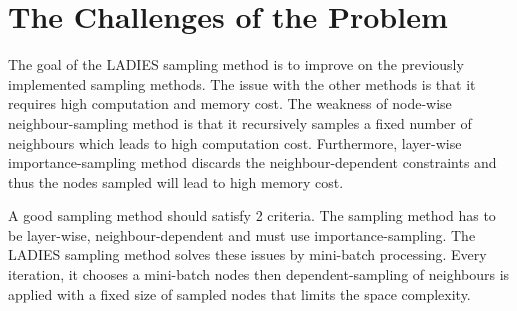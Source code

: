 \chapter{The Challenges of the Problem}

The goal of the LADIES sampling method is to improve on the previously implemented sampling methods. The issue with the other methods is that it requires high computation and memory cost. The weakness of node-wise neighbour-sampling method is that it recursively samples a fixed number of neighbours which leads to high computation cost. Furthermore, layer-wise importance-sampling method discards the neighbour-dependent constraints and thus the nodes sampled will lead to high memory cost. 

A good sampling method should satisfy 2 criteria. The sampling method has to be layer-wise, neighbour-dependent and must use importance-sampling. The LADIES sampling method solves these issues by mini-batch processing. Every iteration, it chooses a mini-batch nodes then dependent-sampling of neighbours is applied with a fixed size of sampled nodes that limits the space complexity.